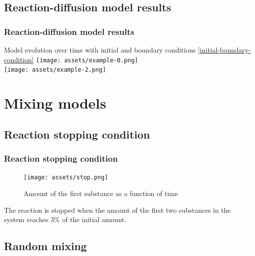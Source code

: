 \documentclass{beamer}
\begin{document}
\subsection{Reaction-diffusion model results}

\begin{frame}
  \frametitle{Reaction-diffusion model results}

  Model evolution over time with initial and boundary conditions \eqref{initial-boundary-condition}
  \centering
  \texttt{[image: assets/example-0.png]} \\ 
  \texttt{[image: assets/example-2.png]}

\end{frame}

\section{Mixing models}
\subsection{Reaction stopping condition}

\begin{frame}
  \frametitle{Reaction stopping condition}

  \centering
  \begin{figure}
    \texttt{[image: assets/stop.png]}
    \caption{Amount of the first substance as a function of time}
  \end{figure}

  The reaction is stopped when the amount of the first two substances in the system reaches 3\% of the initial amount.

\end{frame}

\subsection{Random mixing}
\end{document}
